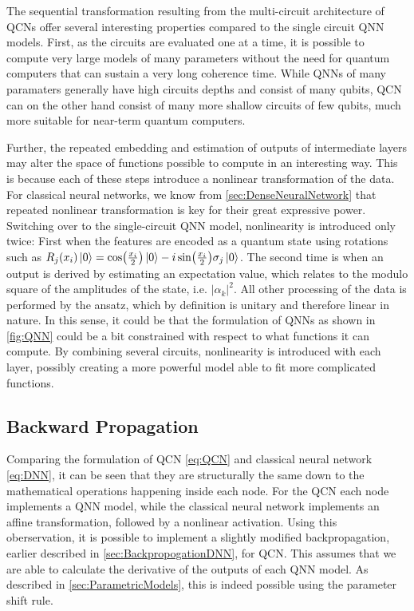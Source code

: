 The sequential transformation resulting from the multi-circuit architecture of QCNs offer several interesting properties compared to the single circuit QNN models. First, as the circuits are evaluated one at a time, it is possible to compute very large models of many parameters without the need for quantum computers that can sustain a very long coherence time. While QNNs of many paramaters generally have high circuits depths and consist of many qubits, QCN can on the other hand consist of many more shallow circuits of few qubits, much more suitable for near-term quantum computers. 

Further, the repeated embedding and estimation of outputs of intermediate layers may alter the space of functions possible to compute in an interesting way. This is because each of these steps introduce a nonlinear transformation of the data. For classical neural networks, we know from \autoref{sec:DenseNeuralNetwork} that repeated nonlinear transformation is key for their great expressive power. Switching over to the single-circuit QNN model, nonlinearity is introduced only twice: First when the features are encoded as a quantum state using rotations such as $R_j(x_i)\ket{0} = \cos(\frac{x_i}{2})\ket{0} - i\sin(\frac{x_i}{2})\sigma_j\ket{0}$. The second time is when an output is derived by estimating an expectation value, which relates to the modulo square of the amplitudes of the state, i.e. $|\alpha_k|^2$. All other processing of the data is performed by the ansatz, which by definition is unitary and therefore linear in nature. In this sense, it could be that the formulation of QNNs as shown in \autoref{fig:QNN} could be a bit constrained with respect to what functions it can compute. By combining several circuits, nonlinearity is introduced with each layer, possibly creating a more powerful model able to fit more complicated functions.  



\subsection{Backward Propagation}\label{sec:BackwardPropagationQCN}
Comparing the formulation of QCN \autoref{eq:QCN} and classical neural network \autoref{eq:DNN}, it can be seen that they are structurally the same down to the mathematical operations happening inside each node. For the QCN each node implements a QNN model, while the classical neural network implements an affine transformation, followed by a nonlinear activation. Using this oberservation, it is possible to implement a slightly modified backpropagation, earlier described in \autoref{sec:BackpropogationDNN}, for QCN. This assumes that we are able to calculate the derivative of the outputs of each QNN model. As described in \autoref{sec:ParametricModels}, this is indeed possible using the parameter shift rule. 

